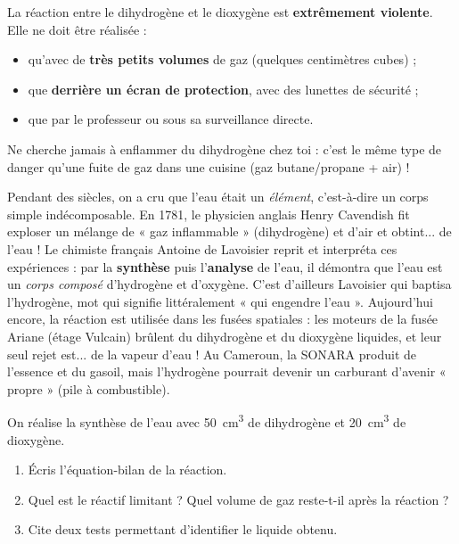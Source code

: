 \documentclass[11pt]{article}
\newcommand{\cle}[1]{{\popxbold\color{popdark}#1}}
\newcounter{popsec}
\newcounter{popsub}
\newcommand{\courssub}[1]{%
  \stepcounter{popsub}%
  \par\vspace{9pt}\noindent{\popxbold\fontsize{11.5}{13}\selectfont\color{popink}{\color{poporange}\thepopsec.\thepopsub}\hspace{6pt}#1}\par\nopagebreak\vspace{4pt}
}
\begin{document}
\courssub{Applications et sécurité}

\begin{attention}
La réaction entre le dihydrogène et le dioxygène est \textbf{extrêmement violente}. Elle ne doit être réalisée :
\begin{itemize}
\item qu'avec de \textbf{très petits volumes} de gaz (quelques centimètres cubes) ;
\item que \textbf{derrière un écran de protection}, avec des lunettes de sécurité ;
\item que par le professeur ou sous sa surveillance directe.
\end{itemize}
Ne cherche jamais à enflammer du dihydrogène chez toi : c'est le même type de danger qu'une fuite de gaz dans une cuisine (gaz butane/propane + air) !
\end{attention}

\begin{savaistu}
Pendant des siècles, on a cru que l'eau était un \emph{élément}, c'est-à-dire un corps simple indécomposable. En 1781, le physicien anglais Henry \cle{Cavendish} fit exploser un mélange de « gaz inflammable » (dihydrogène) et d'air et obtint... de l'eau ! Le chimiste français Antoine de \cle{Lavoisier} reprit et interpréta ces expériences : par la \textbf{synthèse} puis l'\textbf{analyse} de l'eau, il démontra que l'eau est un \emph{corps composé} d'hydrogène et d'oxygène. C'est d'ailleurs Lavoisier qui baptisa l'hydrogène, mot qui signifie littéralement « qui engendre l'eau ». Aujourd'hui encore, la réaction  est utilisée dans les fusées spatiales : les moteurs de la fusée Ariane (étage Vulcain) brûlent du dihydrogène et du dioxygène liquides, et leur seul rejet est... de la vapeur d'eau ! Au Cameroun, la SONARA produit de l'essence et du gasoil, mais l'hydrogène pourrait devenir un carburant d'avenir « propre » (pile à combustible).
\end{savaistu}

\begin{exercice}
On réalise la synthèse de l'eau avec \SI{50}{cm^3} de dihydrogène et \SI{20}{cm^3} de dioxygène.
\begin{enumerate}
\item Écris l'équation-bilan de la réaction.
\item Quel est le réactif limitant ? Quel volume de gaz reste-t-il après la réaction ?
\item Cite deux tests permettant d'identifier le liquide obtenu.
\end{enumerate}
\end{exercice}
\end{document}
